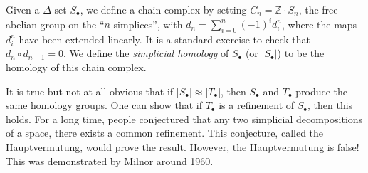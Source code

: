 \documentclass[12pt]{article}
\theoremstyle{plain}
\theoremstyle{definition}
\theoremstyle{remark}
\newcommand{\ZZ}{\ensuremath{\mathbb{Z}}}
\begin{document}
 Given a $\Delta$-set $S_\bullet$, we define a chain complex by setting $C_n=\ZZ\cdot
 S_n$, the free abelian group on the ``$n$-simplices'', with $d_n = \sum_{i=0}^n (-1)^i
 d^n_i$, where the maps $d^n_i$ have been extended linearly. It is a standard exercise to
 check that $d_{n}\circ d_{n-1}=0$. We define the \emph{simplicial homology} of
 $S_\bullet$ (or $|S_\bullet|$) to be the homology of this chain complex.

 It is true but not at all obvious that if $|S_\bullet|\approx |T_\bullet|$, then
 $S_\bullet$ and $T_\bullet$ produce the same homology groups. One can show that if
 $T_\bullet$ is a refinement of $S_\bullet$, then this holds. For a long time, people
 conjectured that any two simplicial decompositions of a space, there exists a common
 refinement. This conjecture, called the Hauptvermutung, would prove the result. However,
 the Hauptvermutung is false! This was demonstrated by Milnor around 1960.
\end{document}
